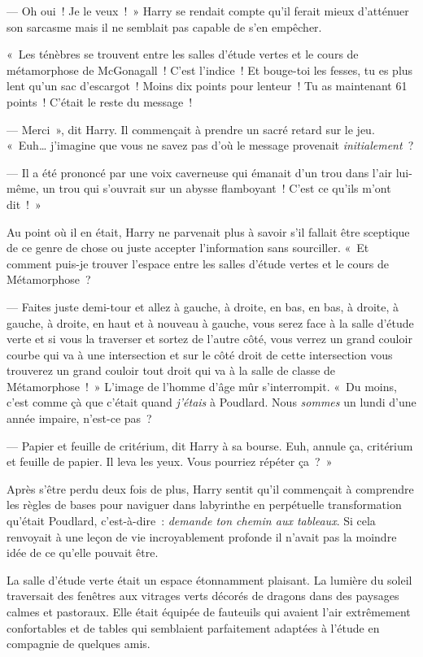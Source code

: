 --- Oh oui~! Je le veux~!~» Harry se rendait compte qu'il ferait mieux d'atténuer son sarcasme mais il ne semblait pas capable de s'en empêcher.

«~Les ténèbres se trouvent entre les salles d'étude vertes et le cours de métamorphose de McGonagall~!
C'est l'indice~! Et bouge-toi les fesses, tu es plus lent qu'un sac d'escargot~!
Moins dix points pour lenteur~!
Tu as maintenant 61 points~!
C'était le reste du message~!

--- Merci~», dit Harry. Il commençait à prendre un sacré retard sur le jeu.
«~Euh… j'imagine que vous ne savez pas d'où le message provenait \emph{initialement}~?

--- Il a été prononcé par une voix caverneuse qui émanait d'un trou dans l'air lui-même, un trou qui s'ouvrait sur un abysse flamboyant~! C'est ce qu'ils m'ont dit~!~»

Au point où il en était, Harry ne parvenait plus à savoir s'il fallait être sceptique de ce genre de chose ou juste accepter l'information sans sourciller.
«~Et comment puis-je trouver l'espace entre les salles d'étude vertes et le cours de Métamorphose~?

--- Faites juste demi-tour et allez à gauche, à droite, en bas, en bas, à droite, à gauche, à droite, en haut et à nouveau à gauche, vous serez face à la salle d'étude verte et si vous la traverser et sortez de l'autre côté, vous verrez un grand couloir courbe qui va à une intersection et sur le côté droit de cette intersection vous trouverez un grand couloir tout droit qui va à la salle de classe de Métamorphose~!~»
L'image de l'homme d'âge mûr s'interrompit.
«~Du moins, c'est comme çà que c'était quand \emph{j'étais} à Poudlard.
Nous \emph{sommes} un lundi d'une année impaire, n'est-ce pas~?

--- Papier et feuille de critérium, dit Harry à sa bourse. Euh, annule ça, critérium et feuille de papier. Il leva les yeux. Vous pourriez répéter ça~?~»

Après s'être perdu deux fois de plus, Harry sentit qu'il commençait à comprendre les règles de bases pour naviguer dans labyrinthe en perpétuelle transformation qu'était Poudlard, c'est-à-dire~: \emph{demande ton chemin aux tableaux}.
Si cela renvoyait à une leçon de vie incroyablement profonde il n'avait pas la moindre idée de ce qu'elle pouvait être.

La salle d'étude verte était un espace étonnamment plaisant.
La lumière du soleil traversait des fenêtres aux vitrages verts décorés de dragons dans des paysages calmes et pastoraux.
Elle était équipée de fauteuils qui avaient l'air extrêmement confortables et de tables qui semblaient parfaitement adaptées à l'étude en compagnie de quelques amis.

